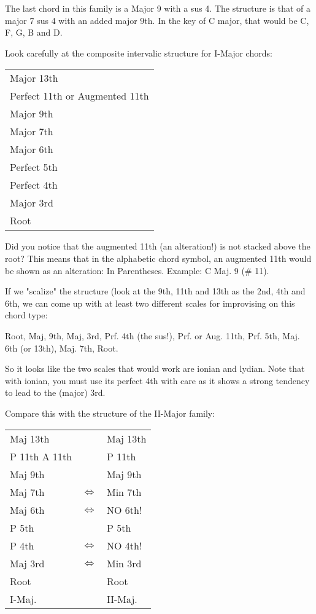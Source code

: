 The last chord in this family is a Major 9 with a sus 4. The structure 
is that of a major 7 sus 4 with an added major 9th. In the key of C major, 
that would be C, F, G, B and D.

Look carefully at the composite intervalic structure for I-Major chords:
\begin{center}
\begin{tabular}{ | l | }
  \hline
  Major 13th\\
  Perfect 11th or Augmented 11th\\
  Major 9th\\
  Major 7th\\
  Major 6th\\
  Perfect 5th\\
  Perfect 4th\\
  Major 3rd\\
  Root\\
  \hline
\end{tabular}
\end{center}

Did you notice that the augmented 11th (an alteration!) is not stacked 
above the root? This means that in the alphabetic chord symbol, an 
augmented 11th would be shown as an alteration: In Parentheses. Example:
C Maj. 9 (\# 11).

If we "scalize" the structure (look at the 9th, 11th and 13th as the 2nd, 
4th and 6th, we can come up with at least two different scales for 
improvising on this chord type:

Root, Maj, 9th, Maj, 3rd, Prf. 4th (the sus!), Prf. or Aug. 11th, 
Prf. 5th, Maj. 6th (or 13th), Maj. 7th, Root. %

So it looks like the two scales that would work are ionian and lydian. 
Note that with ionian, you must use its perfect 4th with care as it shows 
a strong tendency to lead to the (major) 3rd.

Compare this with the structure of the II-Major family:

\begin{center}
\begin{tabular}{ | l c l | }
	\hline
	Maj 13th					&					& Maj 13th				\\
	P 11th   A 11th   & 				& P 11th					\\
	Maj 9th           & 				& Maj 9th					\\
	Maj 7th    				& $\iff$	& Min 7th					\\
	Maj 6th						& $\iff$	& NO 6th!					\\
	P 5th             & 				& P 5th						\\
	P 4th							& $\iff$	& NO 4th!					\\
	Maj 3rd						& $\iff$	& Min 3rd					\\
	Root              & 				& Root						\\
	\hline
  I-Maj.            & 				& II-Maj.					\\
  \hline
\end{tabular}
\end{center}

